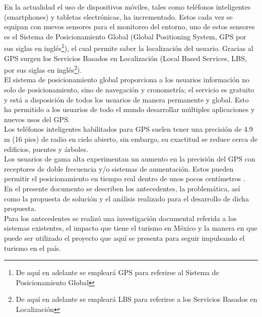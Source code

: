 \vspace*{7cm}
\rightline{{\Huge \textcolor{sectionColor}{Introducción}}}
\vspace*{2cm}


En la actualidad el uso de dispositivos móviles, tales como teléfonos inteligentes (smartphones) y tabletas electrónicas, ha incrementado. Estos cada vez se equipan con nuevos sensores para el monitoreo del entorno, uno de estos sensores es el Sistema de Posicionamiento Global (Global Positioning System, GPS por sus siglas en inglés\footnote{De aquí en adelante se empleará GPS para referirse al Sistema de Posicionamiento Global}), el cual permite saber la localización del usuario. Gracias al GPS surgen los Servicios Basados en Localización (Local Based Services, LBS, por sus siglas en inglés\footnote{De aquí en adelante se empleará LBS para referirse a los Servicios Basados en Localización}).\\

El sistema de posicionamiento global proporciona a los usuarios información no solo de posicionamiento, sino de navegación y cronometría; el servicio es gratuito y está a disposición de todos los usuarios de manera permanente y global. Esto  ha permitido a los usuarios de todo el mundo desarrollar múltiples aplicaciones y nuevos usos del GPS.\\

Los teléfonos inteligentes habilitados para GPS suelen tener una precisión de 4.9 m (16 pies) de radio en cielo abierto, sin embargo, su exactitud se reduce cerca de edificios, puentes y árboles.\\

Los usuarios de gama alta experimentan un aumento en la precisión del GPS con receptores de doble frecuencia y/o sistemas de aumentación. Estos pueden permitir el posicionamiento en tiempo real dentro de unos pocos centímetros \cite{gps}. \\

En el presente documento se describen  los antecedentes, la problemática, así como la propuesta de solución y el análisis realizado para el desarrollo de dicha propuesta.\\

Para los antecedentes se realizó una investigación documental referida a los sistemas existentes, el impacto que tiene el turismo en México y la manera en que puede ser utilizado el proyecto que aquí se presenta para seguir impulsando el turismo en el país. \\

